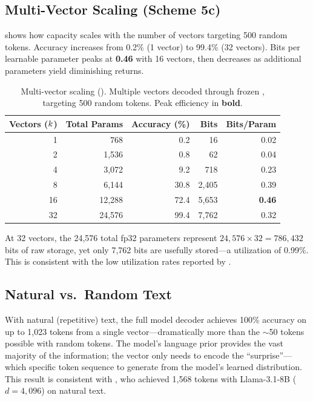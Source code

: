 \subsection{Multi-Vector Scaling (Scheme 5c)}
\label{sec:results_multi}

 shows how capacity scales with the number of \memvec vectors targeting 500 random tokens. Accuracy increases from 0.2\% (1 vector) to 99.4\% (32 vectors). Bits per learnable parameter peaks at \textbf{0.46} with 16 vectors, then decreases as additional parameters yield diminishing returns.

\begin{table}[t]
    \centering
    \caption{Multi-vector scaling (\multidec). Multiple \memvec vectors decoded through frozen \gptwo, targeting 500 random tokens. Peak efficiency in \textbf{bold}.}
    \begin{tabular}{@{}rrrrr@{}}
        \toprule
        \textbf{Vectors ($k$)} & \textbf{Total Params} & \textbf{Accuracy (\%)} & \textbf{Bits} & \textbf{Bits/Param} \\
        \midrule
        1 & 768 & 0.2 & 16 & 0.02 \\
        2 & 1,536 & 0.8 & 62 & 0.04 \\
        4 & 3,072 & 9.2 & 718 & 0.23 \\
        8 & 6,144 & 30.8 & 2,405 & 0.39 \\
        16 & 12,288 & 72.4 & 5,653 & \textbf{0.46} \\
        32 & 24,576 & 99.4 & 7,762 & 0.32 \\
        \bottomrule
    \end{tabular}
    \label{tab:multi}
\end{table}

At 32 vectors, the 24,576 total fp32 parameters represent $24{,}576 \times 32 = 786{,}432$ bits of raw storage, yet only 7,762 bits are usefully stored---a utilization of 0.99\%. This is consistent with the low utilization rates reported by \citet{kuratov2025cramming}.

\subsection{Natural vs.\ Random Text}
\label{sec:results_natural}

With natural (repetitive) text, the full model decoder achieves 100\% accuracy on up to 1,023 tokens from a single \memvec vector---dramatically more than the $\sim$50 tokens possible with random tokens. The model's language prior provides the vast majority of the information; the \memvec vector only needs to encode the ``surprise''---which specific token sequence to generate from the model's learned distribution. This result is consistent with \citet{kuratov2025cramming}, who achieved 1,568 tokens with Llama-3.1-8B ($d = 4{,}096$) on natural text.

